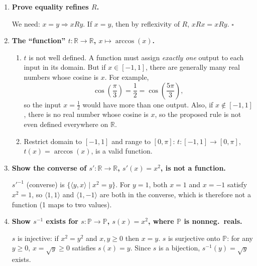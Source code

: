 \documentclass[11pt,openany]{book}
\def\RN{\mathbb{R}}
\def\NNN{\mathbb{P}}
\begin{document}
\begin{enumerate}[{0.}1. ]
\textit{Counterexample}: Let $X = \{1,2,3\}$ and $R = \{\langle 1,1\rangle, \langle 2,2\rangle, \langle 1,2\rangle, \langle 2,1\rangle\}$. Then $R$ is symmetric and transitive but $3 \not\mathrel{R} 3$, so $R$ is not reflexive.

\item \textbf{Prove equality refines $R$.}

We need: $x = y \Rightarrow x R y$. If $x = y$, then by reflexivity of $R$, $x R x = x R y$. $\square$

\item \textbf{The ``function'' $t: \RN \to \RN$, $x \mapsto \arccos(x)$.}

\begin{enumerate}
\item $t$ is not well defined. A function must assign \emph{exactly one} output to each input in its domain. But if $x \in [-1,1]$, there are generally many real numbers whose cosine is $x$. For example,
\[
\cos \left(\frac{\pi}{3}\right)=\frac{1}{2}=\cos \left(\frac{5\pi}{3}\right),
\]
so the input $x=\frac{1}{2}$ would have more than one output. Also, if $x\notin[-1,1]$, there is no real number whose cosine is $x$, so the proposed rule is not even defined everywhere on $\RN$.

\item Restrict domain to $[-1,1]$ and range to $[0,\pi]$: $t: [-1,1] \to [0,\pi]$, $t(x) = \arccos(x)$, is a valid function.
\end{enumerate}

\item \textbf{Show the converse of $s': \RN \to \RN$, $s'(x)=x^2$, is not a function.}

$s'^{-1}$ (converse) is $\{\langle y, x\rangle \mid x^2 = y\}$. For $y = 1$, both $x=1$ and $x=-1$ satisfy $x^2=1$, so $\langle 1,1\rangle$ and $\langle 1,-1\rangle$ are both in the converse, which is therefore not a function (1 maps to two values).

\item \textbf{Show $s^{-1}$ exists for $s: \NNN \to \NNN$, $s(x)=x^2$, where $\NNN$ is nonneg.\ reals.}

$s$ is injective: if $x^2 = y^2$ and $x,y \geq 0$ then $x = y$. $s$ is surjective onto $\NNN$: for any $y \geq 0$, $x = \sqrt{y} \geq 0$ satisfies $s(x)=y$. Since $s$ is a bijection, $s^{-1}(y) = \sqrt{y}$ exists.


\end{enumerate}
\end{document}
